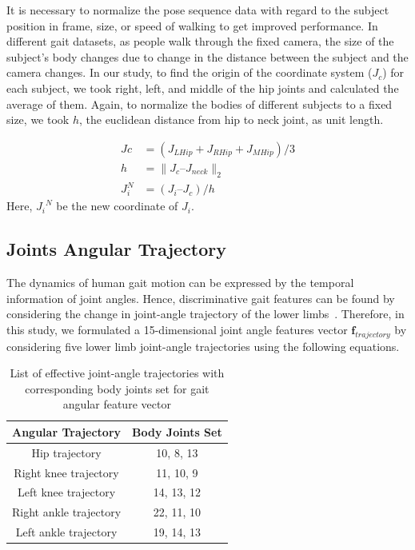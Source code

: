 It is necessary to normalize the pose sequence data with regard to the subject position in frame, size, or speed of walking to get improved performance. In different gait datasets, as people walk through the fixed camera, the size of the subject’s body changes due to change in the distance between the subject and the camera changes. In our study, to find the origin of the coordinate system ($J_c$) for each subject, we took right, left, and middle of the hip joints and calculated the average of them. Again, to normalize the bodies of different subjects to a fixed size, we took $ h $, the euclidean distance from hip to neck joint, as unit length. 

\begin{equation}
\begin{split}
	Jc &= {(J_{LHip}+J_{RHip}+J_{MHip})} / {3} \\
	h &= \parallel {J_c} – {J_{neck}}\parallel_2  \\
	J_{i}^{N}  &= (J_i – J_c) / h 
\end{split}
\end{equation}
Here, ${J_i}^N$ be the new coordinate of $J_{i}$.


\subsection{Joints Angular Trajectory}
The dynamics of human gait motion can be expressed by the temporal information of joint angles. Hence, discriminative gait features can be found by considering the change in joint-angle trajectory of the lower limbs~\cite{Wang_04}. Therefore, in this study, we formulated a 15-dimensional joint angle features vector $\boldsymbol{f}_{trajectory}$ by considering five lower limb joint-angle trajectories using the following equations. 
\begin{table}
	\centering
	\caption{List of effective joint-angle trajectories with corresponding body joints set for gait angular feature vector \label{table:list_joint_angle_trajectory}}
	\begin{tabular}{cc}
		\hline
		\textbf{Angular Trajectory} & \textbf{Body Joints Set}\\
		
		\hline
		Hip trajectory &10, 8, 13 \\
		Right knee trajectory  &11, 10, 9 \\
		Left knee trajectory &14, 13, 12 \\
		Right ankle trajectory &22, 11, 10 \\
		Left ankle trajectory &19, 14, 13 \\
		\hline
	\end{tabular}
\end{table}

